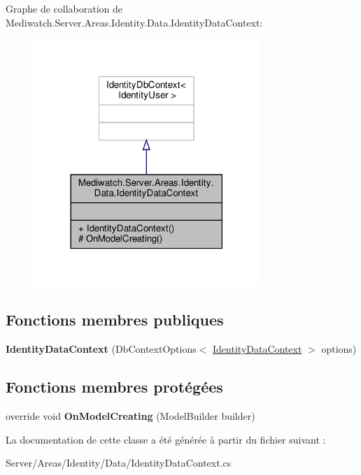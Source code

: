 Graphe de collaboration de Mediwatch.\+Server.\+Areas.\+Identity.\+Data.\+Identity\+Data\+Context\+:
\nopagebreak
\begin{figure}[H]
\begin{center}
\leavevmode
\includegraphics[width=242pt]{class_mediwatch_1_1_server_1_1_areas_1_1_identity_1_1_data_1_1_identity_data_context__coll__graph}
\end{center}
\end{figure}
\subsection*{Fonctions membres publiques}
\begin{DoxyCompactItemize}
\item 
\mbox{\label{class_mediwatch_1_1_server_1_1_areas_1_1_identity_1_1_data_1_1_identity_data_context_ace53da6e49b7d2dff2bb67aad43cfa65}} 
{\bfseries Identity\+Data\+Context} (Db\+Context\+Options$<$ \hyperlink{class_mediwatch_1_1_server_1_1_areas_1_1_identity_1_1_data_1_1_identity_data_context}{Identity\+Data\+Context} $>$ options)
\end{DoxyCompactItemize}
\subsection*{Fonctions membres protégées}
\begin{DoxyCompactItemize}
\item 
\mbox{\label{class_mediwatch_1_1_server_1_1_areas_1_1_identity_1_1_data_1_1_identity_data_context_aa038bee1336ce8e66954bc5cfdc52e7a}} 
override void {\bfseries On\+Model\+Creating} (Model\+Builder builder)
\end{DoxyCompactItemize}


La documentation de cette classe a été générée à partir du fichier suivant \+:\begin{DoxyCompactItemize}
\item 
Server/\+Areas/\+Identity/\+Data/Identity\+Data\+Context.\+cs\end{DoxyCompactItemize}
